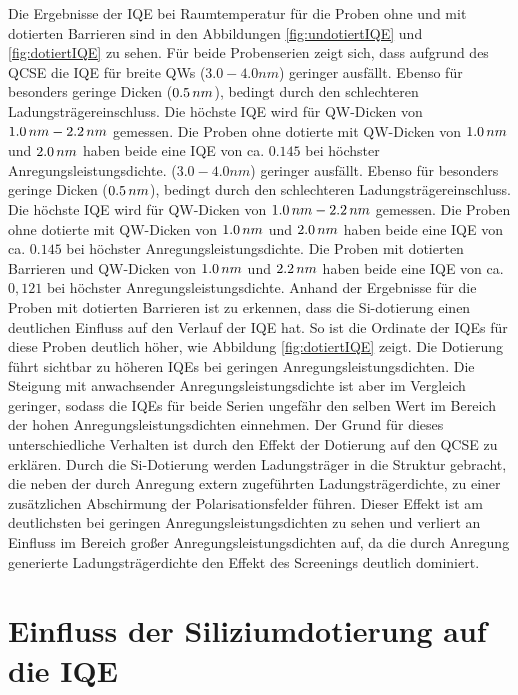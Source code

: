 \noindent 
Die Ergebnisse der IQE bei Raumtemperatur für die Proben ohne und mit dotierten Barrieren sind in den Abbildungen 
\ref{fig:undotiertIQE} und \ref{fig:dotiertIQE} zu sehen. Für beide Probenserien zeigt sich, dass aufgrund des QCSE die IQE für breite QWs 
($3.0 - 4.0  nm$) geringer ausfällt. Ebenso für besonders geringe Dicken ($0.5\thinspace nm$), bedingt durch den schlechteren Ladungsträgereinschluss. Die höchste IQE wird für QW-Dicken von $1.0 \thinspace nm- 2.2 \thinspace nm$ gemessen. Die Proben ohne dotierte mit QW-Dicken von $1.0 \thinspace nm$ und $2.0\thinspace nm$ haben beide eine IQE von ca. $0.145$ bei höchster Anregungsleistungsdichte.
($3.0 - 4.0  nm$) geringer ausfällt. Ebenso für besonders geringe Dicken ($0.5\thinspace nm$), bedingt durch den schlechteren Ladungsträgereinschluss. Die höchste IQE wird für QW-Dicken von $1.0 \thinspace nm- 2.2 \thinspace nm$ gemessen. Die Proben ohne dotierte mit QW-Dicken von $1.0 \thinspace nm$ und $2.0\thinspace nm$ haben beide eine IQE von ca. $0.145$ bei höchster Anregungsleistungsdichte.
\newline
Die Proben mit dotierten Barrieren und QW-Dicken von $1.0 \thinspace nm$ und $2.2\thinspace nm$ haben beide eine IQE von ca. $0,121$ bei höchster Anregungsleistungsdichte. 
\newline
Anhand der Ergebnisse für die Proben mit dotierten Barrieren ist zu erkennen, dass die Si-dotierung einen deutlichen Einfluss auf den Verlauf der IQE hat. So ist die Ordinate der IQEs für diese Proben deutlich höher, wie Abbildung \ref{fig:dotiertIQE} zeigt. Die Dotierung führt sichtbar zu höheren IQEs bei geringen Anregungsleistungsdichten. Die Steigung mit anwachsender Anregungsleistungsdichte ist aber im Vergleich geringer, sodass die IQEs für beide Serien ungefähr den selben Wert im Bereich der hohen Anregungsleistungsdichten einnehmen. 
\newline
Der Grund für dieses unterschiedliche Verhalten ist durch den Effekt der Dotierung auf den QCSE zu erklären. Durch die Si-Dotierung werden Ladungsträger in die Struktur gebracht, die neben der durch Anregung extern zugeführten Ladungsträgerdichte, zu einer zusätzlichen Abschirmung der Polarisationsfelder führen. Dieser Effekt ist am deutlichsten bei geringen Anregungsleistungsdichten zu sehen und verliert an Einfluss im Bereich großer Anregungsleistungsdichten auf, da die durch Anregung generierte Ladungsträgerdichte den Effekt des Screenings deutlich dominiert.

\iffalse
\section{Einfluss der Siliziumdotierung auf die IQE}


